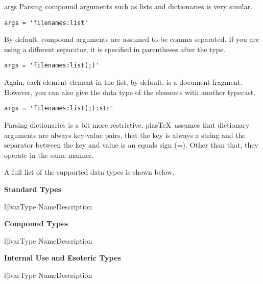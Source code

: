 \documentclass{manual}
\newcommand{\plasTeX}{plas\TeX}
\begin{document}
\begin{memberdesc}[Macro]{args}
Parsing compound arguments such as lists and dictionaries is very similar.
\begin{verbatim}
args = 'filenames:list'
\end{verbatim}
By default, compound arguments are assumed to be comma separated.  If you
are using a different separator, it is specified in parentheses after the type.
\begin{verbatim}
args = 'filenames:list(;)'
\end{verbatim}
Again, each element element in the list, by default, is a document fragment.
However, you can also give the data type of the elements with another typecast.
\begin{verbatim}
args = 'filenames:list(;):str'
\end{verbatim}

Parsing dictionaries is a bit more restrictive.  \plasTeX\ assumes that 
dictionary arguments are always key-value pairs, that the key is always
a string and the separator between the key and value is an equals sign (=).  
Other than that, they operate in the same manner.

A full list of the supported data types is shown below.

\textbf{Standard Types}
\begin{tableii}{l|l}{var}{Type Name}{Description}
\end{tableii}

\textbf{Compound Types}
\begin{tableii}{l|l}{var}{Type Name}{Description}
\end{tableii}

\textbf{Internal Use and Esoteric Types}
\begin{tableii}{l|l}{var}{Type Name}{Description}
\end{tableii}
\end{memberdesc}
\end{document}
